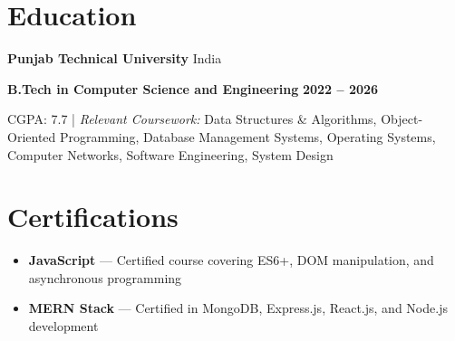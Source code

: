 \documentclass[10pt,a4paper]{article}
\begin{document}
\section{Education}

\textbf{Punjab Technical University} \hfill India

\textbf{B.Tech in Computer Science and Engineering}
\hfill \textbf{2022 -- 2026}

CGPA: 7.7 \;|\; 
\textit{Relevant Coursework:} Data Structures \& Algorithms, Object-Oriented Programming, Database Management Systems, Operating Systems, Computer Networks, Software Engineering, System Design

\section{Certifications}

\begin{itemize}
    \item \textbf{JavaScript} — Certified course covering ES6+, DOM manipulation, and asynchronous programming
    \item \textbf{MERN Stack} — Certified in MongoDB, Express.js, React.js, and Node.js development
\end{itemize}
\end{document}
